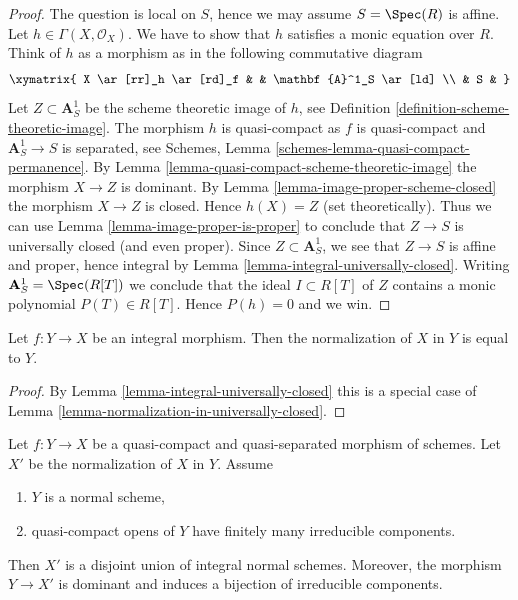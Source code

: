 \begin{proof}
The question is local on $S$, hence we may assume $S = \Spec(R)$
is affine. Let $h \in \Gamma(X, \mathcal{O}_X)$. We have to show that
$h$ satisfies a monic equation over $R$. Think of $h$ as a morphism
as in the following commutative diagram
$$
\xymatrix{
X \ar[rr]_h \ar[rd]_f & & \mathbf{A}^1_S \ar[ld] \\
& S &
}
$$
Let $Z \subset \mathbf{A}^1_S$ be the scheme theoretic image of $h$,
see Definition \ref{definition-scheme-theoretic-image}.
The morphism $h$ is quasi-compact as $f$ is quasi-compact and
$\mathbf{A}^1_S \to S$ is separated, see
Schemes, Lemma \ref{schemes-lemma-quasi-compact-permanence}.
By Lemma \ref{lemma-quasi-compact-scheme-theoretic-image} the
morphism $X \to Z$ is dominant. By
Lemma \ref{lemma-image-proper-scheme-closed} the morphism
$X \to Z$ is closed. Hence $h(X) = Z$ (set theoretically).
Thus we can use
Lemma \ref{lemma-image-proper-is-proper}
to conclude that $Z \to S$ is universally closed (and even proper).
Since $Z \subset \mathbf{A}^1_S$, we see that $Z \to S$ is affine
and proper, hence integral by Lemma \ref{lemma-integral-universally-closed}.
Writing $\mathbf{A}^1_S = \Spec(R[T])$ we conclude that
the ideal $I \subset R[T]$ of $Z$ contains a monic polynomial
$P(T) \in R[T]$. Hence $P(h) = 0$ and we win.
\end{proof}

\begin{lemma}
\label{lemma-normalization-in-integral}
Let $f : Y \to X$ be an integral morphism.
Then the normalization of $X$ in $Y$ is equal to $Y$.
\end{lemma}

\begin{proof}
By Lemma \ref{lemma-integral-universally-closed} this is a special case of
Lemma \ref{lemma-normalization-in-universally-closed}.
\end{proof}

\begin{lemma}
\label{lemma-normal-normalization}
Let $f : Y \to X$ be a quasi-compact and quasi-separated morphism
of schemes. Let $X'$ be the normalization of $X$ in $Y$. Assume
\begin{enumerate}
\item $Y$ is a normal scheme,
\item quasi-compact opens of $Y$ have finitely many irreducible components.
\end{enumerate}
Then $X'$ is a disjoint union of integral normal schemes. Moreover,
the morphism $Y \to X'$ is dominant and induces a bijection of
irreducible components.
\end{lemma}

